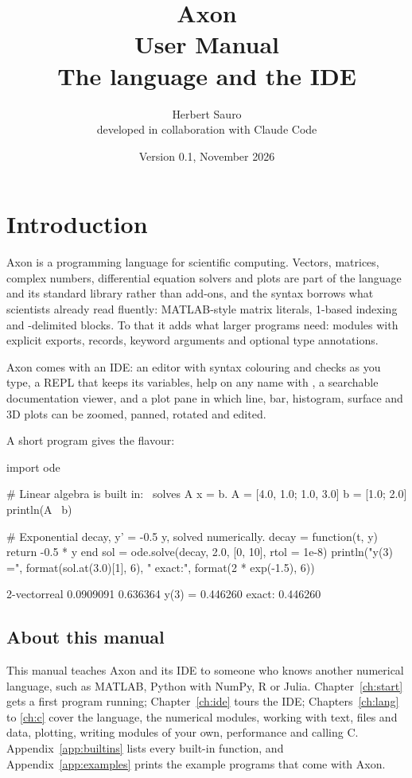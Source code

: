 \documentclass[11pt,a4paper,openany]{report}
\title{\Huge\bfseries Axon\\[6pt]\LARGE User Manual\\[18pt]
  \large The language and the IDE}
\author{Herbert Sauro\\[4pt]\small developed in collaboration with Claude Code}
\date{Version 0.1, November 2026}
\begin{document}
\maketitle
\tableofcontents
\clearpage
{}

\chapter{Introduction}

Axon is a programming language for scientific computing. Vectors, matrices,
complex numbers, differential equation solvers and plots are part of the
language and its standard library rather than add-ons, and the syntax borrows
what scientists already read fluently: MATLAB-style matrix literals, 1-based
indexing and -delimited blocks. To that it adds what larger programs
need: modules with explicit exports, records, keyword arguments and optional
type annotations.

Axon comes with an IDE: an editor with syntax colouring and checks as you type,
a REPL that keeps its variables, help on any name with , a searchable
documentation viewer, and a plot pane in which line, bar, histogram, surface and
3D plots can be zoomed, panned, rotated and edited.

A short program gives the flavour:

\begin{axon}
import ode

# Linear algebra is built in: \ solves A x = b.
A = [4.0, 1.0; 1.0, 3.0]
b = [1.0; 2.0]
println(A \ b)

# Exponential decay, y' = -0.5 y, solved numerically.
decay = function(t, y) return -0.5 * y end
sol = ode.solve(decay, 2.0, [0, 10], rtol = 1e-8)
println("y(3) =", format(sol.at(3.0)[1], 6), " exact:", format(2 * exp(-1.5), 6))
\end{axon}
\begin{axonout}
2-vector{real}
  0.0909091
   0.636364
y(3) = 0.446260  exact: 0.446260
\end{axonout}

\section*{About this manual}

This manual teaches Axon and its IDE to someone who knows another numerical
language, such as MATLAB, Python with NumPy, R or Julia. Chapter~\ref{ch:start}
gets a first program running; Chapter~\ref{ch:ide} tours the IDE;
Chapters~\ref{ch:lang} to \ref{ch:c} cover the language, the numerical modules,
working with text, files and data, plotting, writing modules of your own, performance and calling
C. Appendix~\ref{app:builtins} lists every
built-in function, and Appendix~\ref{app:examples} prints the example programs
that come with Axon.
\end{document}
